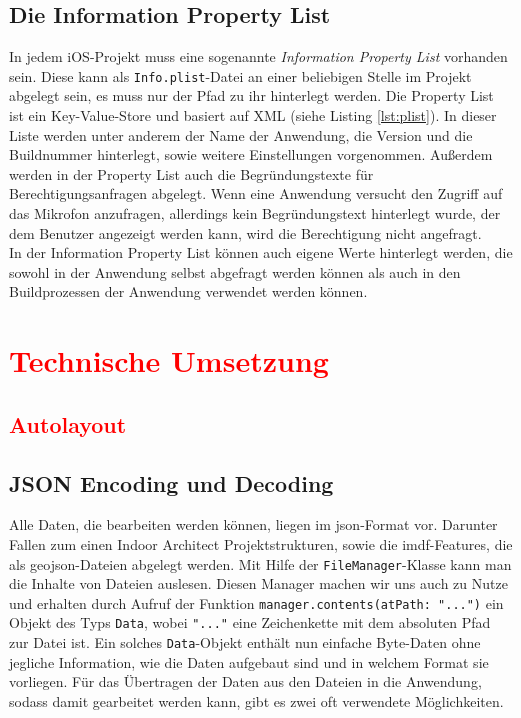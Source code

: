 \subsection{Die Information Property List}
In jedem iOS-Projekt muss eine sogenannte \textit{Information Property List} vorhanden sein.
Diese kann als \texttt{Info.plist}-Datei an einer beliebigen Stelle im Projekt abgelegt sein, es muss nur der Pfad zu ihr hinterlegt werden.
Die Property List ist ein Key-Value-Store und basiert auf XML (siehe Listing \ref{lst:plist}).
In dieser Liste werden unter anderem der Name der Anwendung, die Version und die Buildnummer hinterlegt, sowie weitere Einstellungen vorgenommen.
Außerdem werden in der Property List auch die Begründungstexte für Berechtigungsanfragen abgelegt.
Wenn eine Anwendung versucht den Zugriff auf das Mikrofon anzufragen, allerdings kein Begründungstext hinterlegt wurde, der dem Benutzer angezeigt werden kann, wird die Berechtigung nicht angefragt.
\\
In der Information Property List können auch eigene Werte hinterlegt werden, die sowohl in der Anwendung selbst abgefragt werden können als auch in den Buildprozessen der Anwendung verwendet werden können.

\section{\textcolor{red}{Technische Umsetzung}}
\label{sec:techimp}
\subsection{\textcolor{red}{Autolayout}}
\label{subsec:autolayout}
\subsection{JSON Encoding und Decoding}
\label{subsec:encodingdecoding}
Alle Daten, die bearbeiten werden können, liegen im \ac{json}-Format vor.
Darunter Fallen zum einen Indoor Architect Projektstrukturen, sowie die \ac{imdf}-Features, die als \ac{geojson}-Dateien abgelegt werden.
Mit Hilfe der \texttt{FileManager}-Klasse kann man die Inhalte von Dateien auslesen.
Diesen Manager machen wir uns auch zu Nutze und erhalten durch Aufruf der Funktion \texttt{manager.contents(atPath: "...")} ein Objekt des Typs \texttt{Data}, wobei \texttt{"..."} eine Zeichenkette mit dem absoluten Pfad zur Datei ist.
Ein solches \texttt{Data}-Objekt enthält nun einfache Byte-Daten ohne jegliche Information, wie die Daten aufgebaut sind und in welchem Format sie vorliegen.
Für das Übertragen der Daten aus den Dateien in die Anwendung, sodass damit gearbeitet werden kann, gibt es zwei oft verwendete Möglichkeiten.
